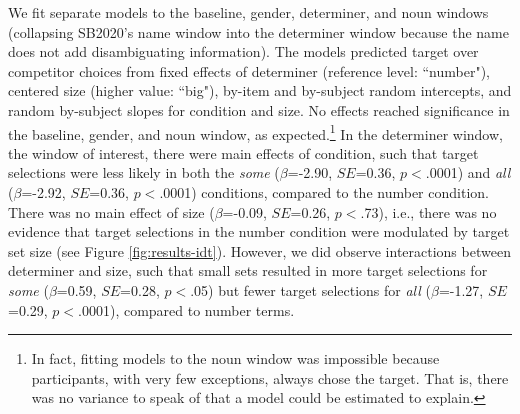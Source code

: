 \documentclass[10pt,letterpaper]{article}
\newcommand{\figref}[1]{Figure \ref{#1}}
\begin{document}
We fit separate models to the baseline, gender, determiner, and noun windows (collapsing SB2020's name window into the determiner window because the name does not add disambiguating information). The models predicted target over competitor choices from fixed effects of determiner (reference level: ``number"), centered size (higher value: ``big"), by-item and by-subject random intercepts, and random by-subject slopes for condition and size. No effects reached significance in the baseline, gender, and noun window, as expected.\footnote{In fact, fitting models to the noun window was impossible because participants, with very few exceptions, always chose the target. That is, there was no variance to speak of that a model could be estimated to explain.}  In the determiner window, the window of interest, there were main effects of condition, such that target selections were less likely in both the \emph{some} ($\beta$=-2.90, $SE$=0.36, $p<$.0001) and \emph{all} ($\beta$=-2.92, $SE$=0.36, $p<$.0001) conditions, compared to the number condition. There was no main effect of size ($\beta$=-0.09, $SE$=0.26, $p<$.73), i.e., there was no evidence that target selections in the number condition were modulated by  target set size (see \figref{fig:results-idt}). However, we did observe interactions between determiner and size, such that small sets resulted in more target selections for \emph{some} ($\beta$=0.59, $SE$=0.28, $p<$.05) but fewer target selections for \emph{all} ($\beta$=-1.27, $SE$=0.29, $p<$.0001), compared to number terms. 

\end{document}
